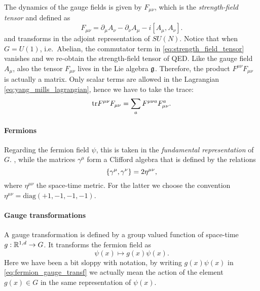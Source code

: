 The dynamics of the gauge fields is given by $F_{\mu \nu}$, which is the \emph{strength-field tensor} and defined as
\begin{equation}
    F_{\mu \nu} = \partial_{\mu} A_{\nu} - \partial_{\nu} A_{\mu} - i [A_{\mu}, A_{\nu}].
    \label{eq:strength_field_tensor}
\end{equation}
and transforms in the adjoint representation of $SU(N)$.
Notice that when $G = U(1)$, i.e.~Abelian, the commutator term in \eqref{eq:strength_field_tensor} vanishes and we re-obtain the strength-field tensor of QED.
Like the gauge field $A_{\mu}$, also the tensor $F_{\mu \nu}$ lives in the Lie algebra $\mathfrak{g}$.
Therefore, the product $F^{\mu \nu} F_{\mu \nu}$ is actually a matrix.
Only scalar terms are allowed in the Lagrangian \eqref{eq:yang_mills_lagrangian}, hence we have to take the trace:
\begin{equation*}
    \text{tr} F^{\mu \nu} F_{\mu \nu} = \sum_{a} F^{\mu \nu a} F_{\mu \nu}^a.
\end{equation*}

\paragraph*{Fermions}

Regarding the fermion field $\psi$, this is taken in the \emph{fundamental representation} of $G$.
, while the matrices $\gamma^{\mu}$ form a Clifford algebra that is defined by the relations
\begin{equation}
    \acomm{\gamma^{\mu}}{\gamma^{\nu}} = 2 \eta^{\mu \nu},
\end{equation}
where $\eta^{\mu \nu}$ the space-time metric.
For the latter we choose the convention $\eta^{\mu \nu} = \mathrm{diag}(+1, -1, -1, -1)$.


\paragraph*{Gauge transformations}

A gauge transformation is defined by a group valued function of space-time $g: \mathbb{R}^{1,d} \to G$.
It transforms the fermion field as
\begin{equation}
    \psi(x) \mapsto g(x) \psi(x).
    \label{eq:fermion_gauge_transf}
\end{equation}
Here we have been a bit sloppy with notation, by writing $g(x) \psi(x)$ in \eqref{eq:fermion_gauge_transf} we actually mean the action of the element $g(x) \in G$ in the same representation of $\psi(x)$.

